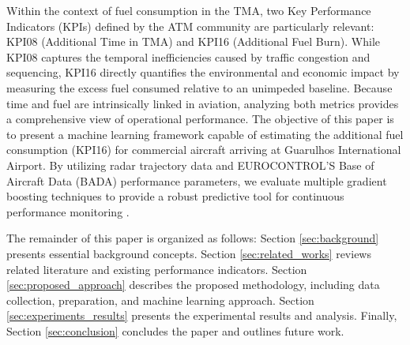 Within the context of fuel consumption in the TMA, two Key Performance Indicators (KPIs) defined by the ATM community are particularly relevant: KPI08 (Additional Time in TMA) and KPI16 (Additional Fuel Burn). While KPI08 captures the temporal inefficiencies caused by traffic congestion and sequencing, KPI16 directly quantifies the environmental and economic impact by measuring the excess fuel consumed relative to an unimpeded baseline. Because time and fuel are intrinsically linked in aviation, analyzing both metrics provides a comprehensive view of operational performance. The objective of this paper is to present a machine learning framework capable of estimating the additional fuel consumption (KPI16) for commercial aircraft arriving at Guarulhos International Airport. By utilizing radar trajectory data and EUROCONTROL'S Base of Aircraft Data (BADA) performance parameters, we evaluate multiple gradient boosting techniques to provide a robust predictive tool for continuous performance monitoring \cite{baklacioglu2021fuel}.

The remainder of this paper is organized as follows: Section \ref{sec:background} presents essential background concepts. Section \ref{sec:related_works} reviews related literature and existing performance indicators. Section \ref{sec:proposed_approach} describes the proposed methodology, including data collection, preparation, and machine learning approach. Section \ref{sec:experiments_results} presents the experimental results and analysis. Finally, Section \ref{sec:conclusion} concludes the paper and outlines future work.